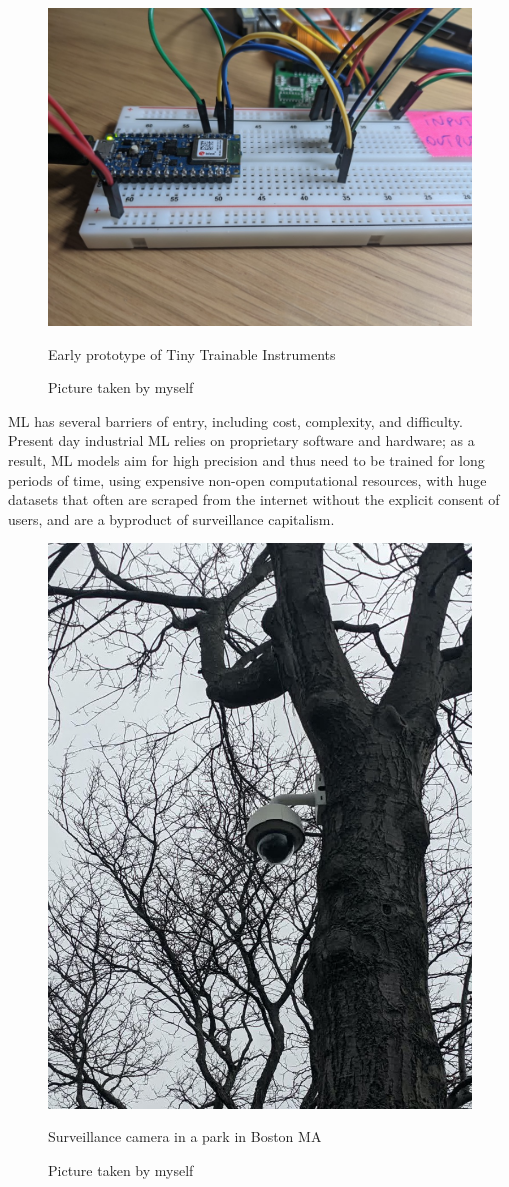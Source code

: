 \begin{figure}[ht]
  \centering
  \includegraphics[width=0.75\linewidth,height=0.25\textheight,keepaspectratio]{images/tiny-trainable-instruments-early-protoype.jpg}
  \caption{Early prototype of Tiny Trainable Instruments}
  \caption*{Picture taken by myself}
  \label{fig:tiny-trainable-instruments-early-protoype}
\end{figure}

\acrshort{ML} has several barriers of entry, including cost, complexity, and difficulty. Present day industrial \acrshort{ML} relies on proprietary software and hardware; as a result, \acrshort{ML} models aim for high precision and thus need to be trained for long periods of time, using expensive non-open computational resources, with huge datasets that often are scraped from the internet without the explicit consent of users, and are a byproduct of surveillance capitalism.

\begin{figure}[ht]
  \centering
  \includegraphics[width=0.75\linewidth,height=0.30\textheight,keepaspectratio]{images/surveillance-camera-tree.jpg}
  \caption{Surveillance camera in a park in Boston MA}
  \caption*{Picture taken by myself}
  \label{fig:surveillance-camera-tree}
\end{figure}

